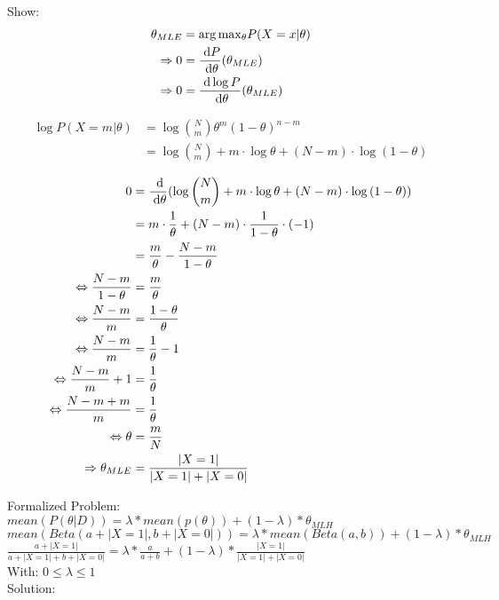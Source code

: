 Show:
\begin{align*}
	\theta_{MLE} &= \mathrm{arg}\,\mathrm{max}_\theta P(X=x|\theta) \\
	\Rightarrow 0 &= \frac{\;\mathrm{d} P}{\;\mathrm{d} \theta}(\theta_{MLE}) \\
	\Rightarrow 0 &= \frac{\;\mathrm{d} \log{P}}{\;\mathrm{d} \theta} (\theta_{MLE})
\end{align*}

\begin{align*}
	\log P(X=m|\theta) &= \log{\binom{N}{m}\theta^m (1-\theta)^{n-m}} \\
	&= \log{\binom{N}{m}}+ m \cdot \log{\theta} + (N-m) \cdot \log{(1-\theta)}
\end{align*}

\begin{align*}
0 &= \frac{\;\mathrm{d}}{\;\mathrm{d} \theta} ( \log{\binom{N}{m}}+ m \cdot \log{\theta} + (N-m) \cdot \log{(1-\theta)} ) \\
	&= m \cdot \frac{1}{\theta} + (N-m) \cdot \frac{1}{1-\theta} \cdot (-1) \\
	&= \frac{m}{\theta} - \frac{N-m}{1-\theta} \\
	\Leftrightarrow \frac{N-m}{1-\theta} &= \frac{m}{\theta} \\
	\Leftrightarrow \frac{N-m}{m} &= \frac{1-\theta}{\theta} \\
	\Leftrightarrow \frac{N-m}{m} &= \frac{1}{\theta} - 1 \\
	\Leftrightarrow \frac{N-m}{m} +1 &= \frac{1}{\theta} \\
	\Leftrightarrow \frac{N-m+m}{m}  &= \frac{1}{\theta} \\
	\Leftrightarrow \theta &= \frac{m}{N} \\
	\Rightarrow \theta_{MLE} &= \frac{|X=1|}{|X=1|+|X=0|} \
	\end{align*}



Formalized Problem: \\
$mean(P(\theta | D )) = \lambda * mean(p(\theta)) + (1-\lambda ) * \theta_{MLH} $ \\
$mean(Beta(a +|X=1|,b +|X=0| )) = \lambda * mean(Beta(a,b)) + (1-\lambda ) * \theta_{MLH} $ \\
$\frac{a+|X=1|}{a+|X=1|+b+|X=0|} = \lambda * \frac{a}{a+b} + (1-\lambda ) * \frac{|X=1|}{|X=1|+|X=0|} $ \\

With: $0\le \lambda \le 1$ \\

Solution:\\

